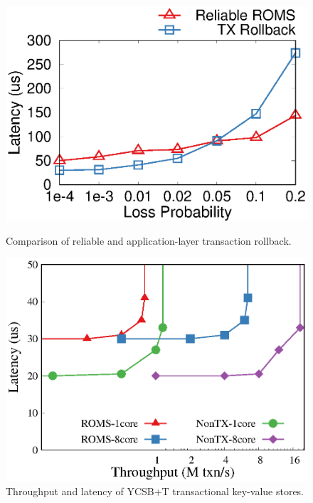 \begin{figure}[t!]
\begin{minipage}{.31\textwidth}
      {\includegraphics[width=\textwidth]{gnuplot/loss_latency.eps}}
      \caption{Comparison of reliable \sys and application-layer transaction rollback.}
      \label{fig:ycsb-loss}
    \end{minipage}
    \hspace{0.01\textwidth}
    \begin{minipage}{.31\textwidth}
    	\centering
		\includegraphics[width=\textwidth]{gnuplot/ycsb.eps}
		\caption{Throughput and latency of YCSB+T transactional key-value stores.}
		\label{fig:ycsb}


\end{minipage}
\end{figure}
